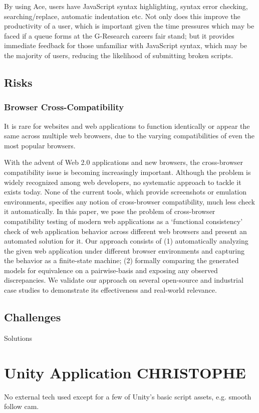 \noindent By using Ace, users have JavaScript syntax highlighting, syntax error checking, searching/replace, automatic indentation etc. Not only does this improve the productivity of a user, which is important given the time pressures which may be faced if a queue forms at the G-Research careers fair stand; but it provides immediate feedback for those unfamiliar with JavaScript syntax, which may be the majority of users, reducing the likelihood of submitting broken scripts.

\subsection{Risks}

\subsubsection{Browser Cross-Compatibility}

It is rare for websites and web applications to function identically or appear the same across multiple web browsers, due to the varying compatibilities of even the most popular browsers.

With the advent of Web 2.0 applications and new browsers,
the cross-browser compatibility issue is becoming increasingly
important. Although the problem is widely recognized
among web developers, no systematic approach to tackle
it exists today. None of the current tools, which provide
screenshots or emulation environments, specifies any notion
of cross-browser compatibility, much less check it automatically.
In this paper, we pose the problem of cross-browser
compatibility testing of modern web applications as a ‘functional
consistency’ check of web application behavior across
different web browsers and present an automated solution
for it. Our approach consists of (1) automatically analyzing
the given web application under different browser environments
and capturing the behavior as a finite-state machine;
(2) formally comparing the generated models for equivalence
on a pairwise-basis and exposing any observed discrepancies.
We validate our approach on several open-source and
industrial case studies to demonstrate its effectiveness and
real-world relevance.

\subsection{Challenges}
Solutions

\section{Unity Application {\color{blue} CHRISTOPHE}}
No external tech used except for a few of Unity's basic script assets, e.g. smooth follow cam.

